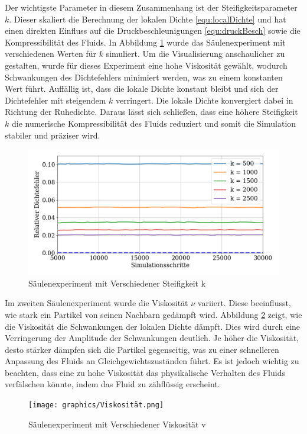 \documentclass[a4paper, 12pt]{article}
\begin{document}
Der wichtigste Parameter in diesem Zusammenhang ist der Steifigkeitsparameter \(k\). Dieser skaliert die Berechnung der lokalen Dichte \eqref{equ:localDichte} und hat einen direkten Einfluss auf die Druckbeschleunigungen \eqref{equ:druckBesch} sowie die Kompressibilität des Fluids. In Abbildung \ref{Säulenexperiment_k} wurde das Säulenexperiment mit verschiedenen Werten für \(k\) simuliert. Um die Visualisierung anschaulicher zu gestalten, wurde für dieses Experiment eine hohe Viskosität gewählt, wodurch Schwankungen des Dichtefehlers minimiert werden, was zu einem konstanten Wert führt. Auffällig ist, dass die lokale Dichte konstant bleibt und sich der Dichtefehler mit steigendem \(k\) verringert. Die lokale Dichte konvergiert dabei in Richtung der Ruhedichte. Daraus lässt sich schließen, dass eine höhere Steifigkeit \(k\) die numerische Kompressibilität des Fluids reduziert und somit die Simulation stabiler und präziser wird.

\begin{figure}[H]
	\centering
	\includegraphics[width=.85\textwidth]{graphics/Steifigkeit.png}	
	\caption{Säulenexperiment mit Verschiedener Steifigkeit k}
	\label{Säulenexperiment_k}
\end{figure}

Im zweiten Säulenexperiment wurde die Viskosität \(\nu\) variiert. Diese beeinflusst, wie stark ein Partikel von seinen Nachbarn gedämpft wird. Abbildung \ref{Säulenexperiment_v} zeigt, wie die Viskosität die Schwankungen der lokalen Dichte dämpft. Dies wird durch eine Verringerung der Amplitude der Schwankungen deutlich. Je höher die Viskosität, desto stärker dämpfen sich die Partikel gegenseitig, was zu einer schnelleren Anpassung des Fluids an Gleichgewichtszuständen führt. Es ist jedoch wichtig zu beachten, dass eine zu hohe Viskosität das physikalische Verhalten des Fluids verfälschen könnte, indem das Fluid zu zähflüssig erscheint.

\begin{figure}[H]
	\centering
	\texttt{[image: graphics/Viskosität.png]}	
	\caption{Säulenexperiment mit Verschiedener Viskosität v}
	\label{Säulenexperiment_v}
\end{figure}
\end{document}
